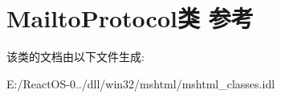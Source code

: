 \hypertarget{class_mailto_protocol}{}\section{Mailto\+Protocol类 参考}
\label{class_mailto_protocol}


该类的文档由以下文件生成\+:\begin{DoxyCompactItemize}
\item 
E\+:/\+React\+O\+S-\/0../dll/win32/mshtml/mshtml\+\_\+classes.\+idl\end{DoxyCompactItemize}
